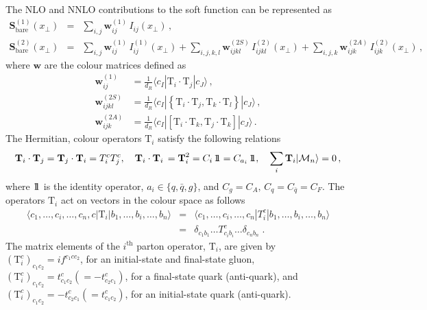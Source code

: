 \documentclass[a4paper,11pt]{article}
\newcommand{\unitop}{{\boldmath{1\!\!1}}}
\newcommand{\qbar}{{\bar q}}
\newcommand{\bfS}{\bm{S}}
\newcommand{\xT}{x_\perp}
\def\cT{\bm{\mathrm{T}}}
\def\cm{\mathcal{M}}
\def\la{\langle}
\def\ra{\rangle}
\numberwithin{equation}{section}
\begin{document}
The NLO and NNLO contributions to the soft function can be represented as
%
\begin{eqnarray}
  \bfS^{(1)}_\text{bare}(x_\perp) & = &
  \sum_{i,j} \mathbold{w}_{ij}^{(1)}\, I_{ij}(\xT)\,, 
  \label{S1bareNLO}
  \\
  \bfS^{(2)}_\text{bare}(x_\perp) & = &
  \sum_{i,j} \mathbold{w}^{(1)}_{ij}\, I_{ij}^{(1)}(\xT) +
  \sum_{i,j,k,l} \mathbold{w}^{(2S)}_{ijkl}\, I_{ijkl}^{(2)}(\xT) +
  \sum_{i,j,k} \mathbold{w}^{(2A)}_{ijk}\, I_{ijk}^{(2)}(\xT)\,,
  \label{S1bareNNLO}
\end{eqnarray}
%
where $\mathbold{w}$ are the colour matrices defined as
%
%
\begin{subequations}
  \begin{align}
   \bm{w}_{ij}^{(1)} & =
   \frac{1}{d_R} \langle c_I | \cT_i\cdot\cT_j | c_J \rangle\,,
   \label{eq:w1def}
   \\[0.5em]
   \bm{w}_{ijkl}^{(2S)} & =
   \frac{1}{d_R} \langle c_I | \left\{\cT_i\cdot\cT_j, \cT_k\cdot\cT_l\right\} 
   | c_J \rangle\,,
   \label{eq:w2def}
   \\[0.5em]
   \bm{w}_{ijk}^{(2A)} & =
   \frac{1}{d_R} \langle c_I | \left[\cT_i\cdot\cT_k, \cT_j\cdot\cT_k\right] 
   | c_J \rangle\,.
   \label{eq:w3def}
  \end{align}
  \label{eq:w1w2def}
\end{subequations}
%
The Hermitian, colour operators $\cT_i$ satisfy the following
relations~\cite{Catani:1996vz}
%
\begin{equation}
\cT_i \cdot \cT_j=\cT_j\cdot\cT_i = T^c_iT^c_j, \quad
\cT_i \cdot \cT_i\,  = \cT_i^2=C_i\, \unitop =C_{a_i}\, \unitop, \quad
\sum_{i}\cT_i|\cm_{n}\ra=0 \,,
\end{equation}
%
where $\unitop$ is the identity operator, $a_i \in \{q, \qbar, g\}$, and
$C_g = C_A,\, C_q = C_{\bar{q}} = C_F$.
The operators $\cT_i$ act on vectors in the colour space as follows
%
\begin{eqnarray}
\la c_1,\dots,c_i,\dots,c_n,c|\cT_i|b_1,\dots,b_i,\dots,b_n\ra &=&
\la c_1,\dots,c_i,\dots,c_n|T^c_i|b_1,\dots,b_i,\dots,b_n\ra
\nonumber\\ &=& \delta_{c_1b_1} \dots T^c_{c_i b_i}\dots\delta_{c_nb_n} \; .
\end{eqnarray}
%
The matrix elements of the $i^\text{th}$ parton operator, $\cT_i$, are given by
$\left(\cT^c_i\right)_{c_1c_2} = if^{c_1cc_2}$, for an initial-state and
final-state gluon, $\left(\cT^c_i\right)_{c_1 c_2}= t^c_{c_1 c_2} (= -t^c_{c_2
c_1})$, for a final-state quark (anti-quark), and $\left(\cT^c_i\right)_{c_1 c_2} =
-t^c_{c_2 c_1} (= t^c_{c_1 c_2})$, for an initial-state quark (anti-quark).
\end{document}
